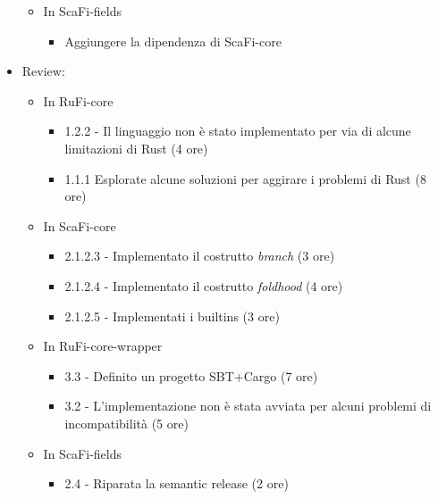 \documentclass[12pt, a4paper]{article}
\begin{document}
\begin{itemize}
\begin{itemize}
              \item In ScaFi-fields
                    \begin{itemize}
                        \item Aggiungere la dipendenza di ScaFi-core
                    \end{itemize}
          \end{itemize}
    \item Review:
          \begin{itemize}
              \color{teal}
              \item In RuFi-core
                    \begin{itemize}
                        \item 1.2.2 - Il linguaggio non è stato implementato per via di alcune limitazioni di Rust (4 ore)
                        \item 1.1.1 Esplorate alcune soluzioni per aggirare i problemi di Rust (8 ore)
                    \end{itemize}
                    \color{cyan}
              \item In ScaFi-core
                    \begin{itemize}
                        \item 2.1.2.3 - Implementato il costrutto \textit{branch} (3 ore)
                        \item 2.1.2.4 - Implementato il costrutto \textit{foldhood} (4 ore)
                        \item 2.1.2.5 - Implementati i builtins (3 ore)
                    \end{itemize}
                    \color{magenta}
              \item In RuFi-core-wrapper
                    \begin{itemize}
                        \item 3.3 - Definito un progetto SBT+Cargo (7 ore)
                        \item 3.2 - L'implementazione non è stata avviata per alcuni problemi di incompatibilità (5 ore)
                    \end{itemize}
                    \color{blue}
              \item In ScaFi-fields
                    \begin{itemize}
                        \item 2.4 - Riparata la semantic release (2 ore)
                    \end{itemize}
          \end{itemize}
\end{itemize}
\end{document}
